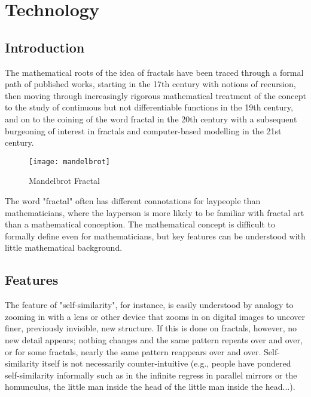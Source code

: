 \documentclass{fisattraining}
\begin{document}
\chapter{Technology}
\setcounter{page}{1}
\renewcommand{\baselinestretch}{1.50}
\section{Introduction}
The mathematical roots of the idea of fractals have been traced through a formal path of published works, starting in the 17th century with notions of recursion, then moving through increasingly rigorous mathematical treatment of the concept to the study of continuous but not differentiable functions in the 19th century, and on to the coining of the word fractal in the 20th century with a subsequent burgeoning of interest in fractals and computer-based modelling in the 21st century.
\begin{figure}[h!]
\begin{center}
\texttt{[image: mandelbrot]}
\caption{Mandelbrot Fractal}
\end{center}
\end{figure}
The word "fractal" often has different connotations for laypeople than mathematicians, where the layperson is more likely to be familiar with fractal art than a mathematical conception. The mathematical concept is difficult to formally define even for mathematicians, but key features can be understood with little mathematical background.
\section{Features}
The feature of "self-similarity", for instance, is easily understood by analogy to zooming in with a lens or other device that zooms in on digital images to uncover finer, previously invisible, new structure. If this is done on fractals, however, no new detail appears; nothing changes and the same pattern repeats over and over, or for some fractals, nearly the same pattern reappears over and over. Self-similarity itself is not necessarily counter-intuitive (e.g., people have pondered self-similarity informally such as in the infinite regress in parallel mirrors or the homunculus, the little man inside the head of the little man inside the head...). 
\end{document}
